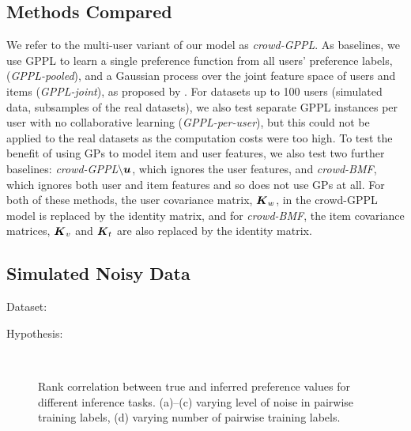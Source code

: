 \subsection{Methods Compared}

We refer to the multi-user variant of our model as \emph{crowd-GPPL}.
As baselines, we use GPPL to learn a single preference function from all users' preference labels, (\emph{GPPL-pooled}), and a Gaussian process over the joint feature space of users and items 
(\emph{GPPL-joint}), as proposed by \citet{guo2010gaussian}.
For datasets up to 100 users (simulated data, subsamples of the real datasets), 
we also test separate GPPL instances per user with no collaborative
learning (\emph{GPPL-per-user}), but this could not be applied to the real datasets as the 
computation costs were too high.
To test the benefit of using GPs to model item and user features,
we also test two further baselines: 
\emph{crowd-GPPL$\mathbf{\setminus \boldsymbol u}$}, which ignores the user features,
and \emph{crowd-BMF}, which ignores both user and item features and so does not use GPs at all. 
For both of these methods, the user covariance matrix, $\boldsymbol K_w$, in the crowd-GPPL model is replaced by the identity matrix, and for \emph{crowd-BMF}, the item covariance matrices, $\boldsymbol K_v$ and $\boldsymbol K_t$ are also replaced by the identity matrix.



\subsection{Simulated Noisy Data}\label{sec:exp_synth}

Dataset:

Hypothesis: 

\begin{figure}
 \\
\caption{Rank correlation between true and inferred preference values for different inference tasks.  (a)--(c) varying level of noise in pairwise training labels, (d) varying number of pairwise training labels. 
}
\end{figure}

